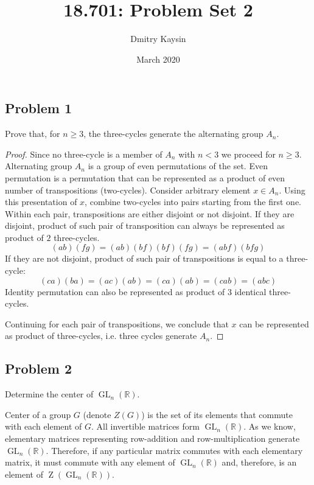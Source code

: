 \documentclass{article}
\title{18.701: Problem Set 2}
\author{Dmitry Kaysin}
\date{March 2020}
\theoremstyle{definition}
\newcommand{\R}{\mathbb{R}}
\newcommand{\GL}{\operatorname{GL}}
\newcommand{\GLnR}{\GL_n(\R)}
\begin{document}
\maketitle 


\subsection*{Problem 1}

\begin{tcolorbox}
Prove that, for $n \geq 3$, the three-cycles generate the alternating group $A_n$.
\end{tcolorbox}
\begin{proof}

Since no three-cycle is a member of $A_n$ with $n < 3$ we proceed for $n \geq 3$.
Alternating group $A_n$ is a group of even permutations of the set.
Even permutation is a permutation that can be represented as a product of even number of transpositions (two-cycles). 
Consider arbitrary element $x \in A_n$. Using this presentation of $x$, combine two-cycles into pairs starting from the first one.
Within each pair, transpositions are either disjoint or not disjoint.
If they are disjoint, product of such pair of transposition can always be represented as product of $2$ three-cycles.
\[ (ab)(fg) = (ab)(bf)(bf)(fg) = (abf)(bfg) \]
If they are not disjoint, product of such pair of transpositions is equal to a three-cycle:
\[ (ca)(ba) = (ac)(ab) = (ca)(ab) = (cab) = (abc) \]
Identity permutation can also be represented as product of $3$ identical three-cycles.

Continuing for each pair of transpositions, we conclude that $x$ can be represented as product of three-cycles, i.e. three cycles generate $A_n$.

\end{proof}


\subsection*{Problem 2}

\begin{tcolorbox}
Determine the center of $\GLnR$.
\end{tcolorbox}

Center of a group $G$ (denote $Z(G)$) is the set of its elements that commute with each element of $G$.
All invertible matrices form $\GLnR$.
As we know, elementary matrices representing row-addition and row-multiplication generate $\GLnR$.
Therefore, if any particular matrix commutes with each elementary matrix, it must commute with any element of $\GLnR$ and, therefore, is an element of $\operatorname{Z}(\GLnR)$.
\end{document}
